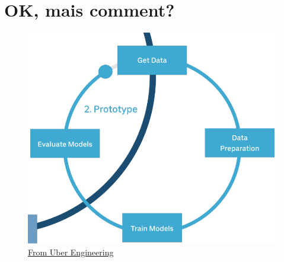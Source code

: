 \documentclass[aspectratio=169,10pt,xcolor=x11names,english,french]{beamer}
\begin{document}
	\section{OK, mais comment?}
	
	\begin{frame}
		\begin{figure}
			\centering
			\includegraphics[scale=0.3]{img/cycle-2.png}
			\caption{\href{https://eng.uber.com/scaling-michelangelo/}{From Uber Engineering}}
		\end{figure}
	\end{frame}
\end{document}
